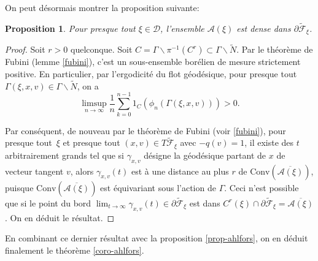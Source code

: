 \documentclass[JEP,XML,SOM,Unicode,francais,published]{cedram}
\newtheorem{prop}[thm]{Proposition}
\theoremstyle{definition}
\begin{document}
On peut désormais montrer la proposition suivante:
\begin{prop}
Pour presque tout $\xi \in \mathscr{D}$, l'ensemble $\mathscr{A}(\xi)$ est dense dans $\partial \tilde{\mathscr{F}}_\xi$.
\end{prop}
\begin{proof}
Soit $r > 0$ quelconque. Soit $C = \Gamma\backslash\pi^{-1}(C^r) \subset \Gamma\backslash \tilde{N}$. Par le théorème de Fubini (\cf lemme \ref{fubini}), c'est un sous-ensemble borélien de mesure strictement positive. En particulier, par l'ergodicité du flot géodésique, pour presque tout $\Gamma(\xi, x, v) \in \Gamma\backslash \tilde{N}$, on a
\[\limsup_{n \to \infty} \frac{1}{n}\sum_{k = 0}^{n - 1} 1_C\left(\phi_n\left(\Gamma(\xi, x, v)\right)\right) > 0.\]

Par conséquent, de nouveau par le théorème de Fubini (voir \ref{fubini}), pour presque tout~$\xi$ et presque tout $(x, v) \in T\tilde{\mathscr{F}}_\xi$ avec $-q(v) = 1$, il existe des $t$ arbitrairement grands tel que si $\gamma_{x, v}$ désigne la géodésique partant de $x$ de vecteur tangent $v$, alors $\gamma_{x, v}(t)$ est à une distance au plus $r$ de $\mathrm{Conv}(\overline{\mathscr{A}(\xi)})$, puisque $\mathrm{Conv}(\overline{\mathscr{A}(\xi)})$ est équivariant sous l'action de $\Gamma$. Ceci n'est possible que si le point du bord $\lim_{t \to \infty}\gamma_{x, v}(t) \in \partial \tilde{\mathscr{F}}_\xi$ est dans $C^r(\xi) \cap \partial \tilde{\mathscr{F}}_\xi = \overline{\mathscr{A}(\xi)}$. On en déduit le résultat.
\end{proof}

En combinant ce dernier résultat avec la proposition \ref{prop-ahlfors}, on en déduit finalement le théorème \ref{coro-ahlfors}.

\appendix
\end{document}

